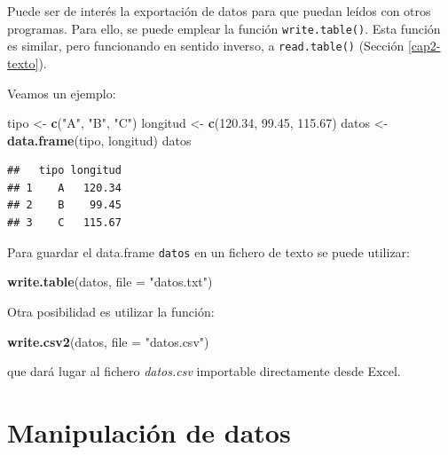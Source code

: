 \documentclass[]{book}
\newenvironment{Shaded}{\begin{snugshade}}{\end{snugshade}}
\newcommand{\DataTypeTok}[1]{\textcolor[rgb]{0.13,0.29,0.53}{#1}}
\newcommand{\FloatTok}[1]{\textcolor[rgb]{0.00,0.00,0.81}{#1}}
\newcommand{\KeywordTok}[1]{\textcolor[rgb]{0.13,0.29,0.53}{\textbf{#1}}}
\newcommand{\NormalTok}[1]{#1}
\newcommand{\StringTok}[1]{\textcolor[rgb]{0.31,0.60,0.02}{#1}}
\begin{document}
Puede ser de interés la
exportación de datos para que puedan leídos con otros programas. Para
ello, se puede emplear la función \texttt{write.table()}. Esta función es
similar, pero funcionando en sentido inverso, a \texttt{read.table()}
(Sección \ref{cap2-texto}).

Veamos un ejemplo:

\begin{Shaded}
\begin{Highlighting}[]
\NormalTok{tipo <-}\StringTok{ }\KeywordTok{c}\NormalTok{(}\StringTok{"A"}\NormalTok{, }\StringTok{"B"}\NormalTok{, }\StringTok{"C"}\NormalTok{)}
\NormalTok{longitud <-}\StringTok{ }\KeywordTok{c}\NormalTok{(}\FloatTok{120.34}\NormalTok{, }\FloatTok{99.45}\NormalTok{, }\FloatTok{115.67}\NormalTok{)}
\NormalTok{datos <-}\StringTok{ }\KeywordTok{data.frame}\NormalTok{(tipo, longitud)}
\NormalTok{datos}
\end{Highlighting}
\end{Shaded}

\begin{verbatim}
##   tipo longitud
## 1    A   120.34
## 2    B    99.45
## 3    C   115.67
\end{verbatim}

Para guardar el data.frame \texttt{datos} en un fichero de texto se
puede utilizar:

\begin{Shaded}
\begin{Highlighting}[]
\KeywordTok{write.table}\NormalTok{(datos, }\DataTypeTok{file =} \StringTok{"datos.txt"}\NormalTok{)}
\end{Highlighting}
\end{Shaded}

Otra posibilidad es utilizar la función:

\begin{Shaded}
\begin{Highlighting}[]
\KeywordTok{write.csv2}\NormalTok{(datos, }\DataTypeTok{file =} \StringTok{"datos.csv"}\NormalTok{)}
\end{Highlighting}
\end{Shaded}

que dará lugar al fichero \emph{datos.csv} importable directamente desde Excel.

\hypertarget{manipulacion-de-datos}{%
\section{Manipulación de datos}\label{manipulacion-de-datos}}
\end{document}
